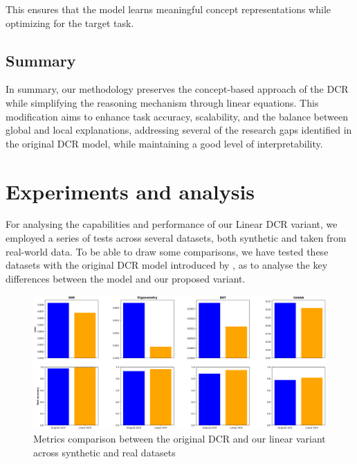 \documentclass[sigconf, nonacm]{acmart}
\begin{document}
This ensures that the model learns meaningful concept representations while optimizing for the target task. \vspace{6pt}

\subsection{Summary}
\vspace{2pt}
In summary, our methodology preserves the concept-based approach of the DCR while simplifying the reasoning mechanism through linear equations. This modification aims to enhance task accuracy, scalability, and the balance between global and local explanations, addressing several of the research gaps identified in the original DCR model, while maintaining a good level of interpretability. \vspace{8pt}

\section{Experiments and analysis}
\vspace{2pt}
For analysing the capabilities and performance of our Linear DCR variant, we employed a series of tests across several datasets, both synthetic and taken from real-world data. To be able to draw some comparisons, we have tested these datasets with the original DCR model introduced by \citet{barbiero2023interpretable}, as to analyse the key differences between the model and our proposed variant. \vspace{6pt}

\begin{figure}[ht]
\centering
\includegraphics[width=1\linewidth]{./DCR_comparisons.png}
\caption{Metrics comparison between the original DCR and our linear variant across synthetic and real datasets}
\label{fig:figure1}
\end{figure}
\end{document}

